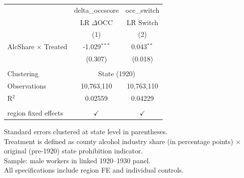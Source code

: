 
\begingroup
\centering
\begin{tabular}{lcc}
   \toprule
                              & delta\_occscore  & occ\_switch\\
                              & LR $\Delta$OCC   & LR Switch \\
                              & (1)              & (2)\\
   \midrule
   AlcShare $\times$ Treated  & -1.029$^{***}$   & 0.043$^{**}$\\
                              & (0.307)          & (0.018)\\
    \\
   Clustering & \multicolumn{2}{c}{State (1920)} \\
   Observations               & 10,763,110       & 10,763,110\\
   R$^2$                      & 0.02559          & 0.04229\\
    \\
   region fixed effects       & $\checkmark$     & $\checkmark$\\
   \bottomrule
\end{tabular}

\par \raggedright
Standard errors clustered at state level in parentheses.\\
Treatment is defined as county alcohol industry share (in percentage points) $\times$ original (pre-1920) state prohibition indicator.\\
Sample: male workers in linked 1920--1930 panel.\\
All specifications include region FE and individual controls.
\par\endgroup

